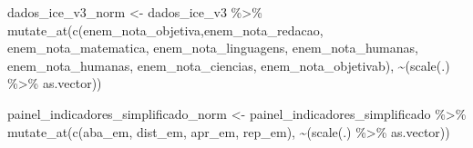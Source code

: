 \documentclass[
  letterpaper,
  DIV=11,
  numbers=noendperiod]{scrartcl}
\newenvironment{Shaded}{\begin{snugshade}}{\end{snugshade}}
\newcommand{\FunctionTok}[1]{\textcolor[rgb]{0.28,0.35,0.67}{#1}}
\newcommand{\NormalTok}[1]{\textcolor[rgb]{0.00,0.23,0.31}{#1}}
\newcommand{\OtherTok}[1]{\textcolor[rgb]{0.00,0.23,0.31}{#1}}
\newcommand{\SpecialCharTok}[1]{\textcolor[rgb]{0.37,0.37,0.37}{#1}}
\newcommand{\StringTok}[1]{\textcolor[rgb]{0.13,0.47,0.30}{#1}}
\begin{document}
\begin{Shaded}
\begin{Highlighting}[]
\NormalTok{dados\_ice\_v3\_norm }\OtherTok{\textless{}{-}}\NormalTok{ dados\_ice\_v3 }\SpecialCharTok{\%\textgreater{}\%} 
  \FunctionTok{mutate\_at}\NormalTok{(}\FunctionTok{c}\NormalTok{(}\StringTok{\textquotesingle{}enem\_nota\_objetiva\textquotesingle{}}\NormalTok{,}\StringTok{\textquotesingle{}enem\_nota\_redacao\textquotesingle{}}\NormalTok{, }\StringTok{\textquotesingle{}enem\_nota\_matematica\textquotesingle{}}\NormalTok{, }\StringTok{\textquotesingle{}enem\_nota\_linguagens\textquotesingle{}}\NormalTok{,}
              \StringTok{\textquotesingle{}enem\_nota\_humanas\textquotesingle{}}\NormalTok{, }\StringTok{\textquotesingle{}enem\_nota\_humanas\textquotesingle{}}\NormalTok{, }\StringTok{\textquotesingle{}enem\_nota\_ciencias\textquotesingle{}}\NormalTok{, }\StringTok{\textquotesingle{}enem\_nota\_objetivab\textquotesingle{}}\NormalTok{), }
            \SpecialCharTok{\textasciitilde{}}\NormalTok{(}\FunctionTok{scale}\NormalTok{(.) }\SpecialCharTok{\%\textgreater{}\%}\NormalTok{ as.vector))}

\NormalTok{painel\_indicadores\_simplificado\_norm }\OtherTok{\textless{}{-}}\NormalTok{ painel\_indicadores\_simplificado }\SpecialCharTok{\%\textgreater{}\%} 
  \FunctionTok{mutate\_at}\NormalTok{(}\FunctionTok{c}\NormalTok{(}\StringTok{\textquotesingle{}aba\_em\textquotesingle{}}\NormalTok{, }\StringTok{\textquotesingle{}dist\_em\textquotesingle{}}\NormalTok{, }\StringTok{\textquotesingle{}apr\_em\textquotesingle{}}\NormalTok{, }\StringTok{\textquotesingle{}rep\_em\textquotesingle{}}\NormalTok{),  }\SpecialCharTok{\textasciitilde{}}\NormalTok{(}\FunctionTok{scale}\NormalTok{(.) }\SpecialCharTok{\%\textgreater{}\%}\NormalTok{ as.vector))}
\end{Highlighting}
\end{Shaded}
\end{document}
